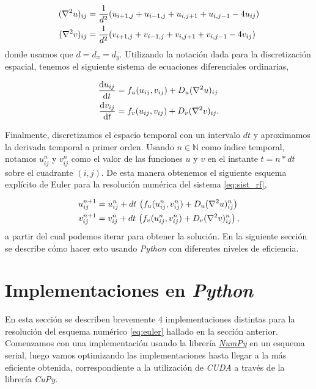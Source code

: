 \begin{equation}
  \begin{split}
    (\laplacian u)_{ij} &= \frac{1}{d^2}(u_{i+1,j}+u_{i-1,j}+u_{i,j+1}+u_{i,j-1}-4u_{ij})\\
    (\laplacian v)_{ij} &= \frac{1}{d^2}(v_{i+1,j}+v_{i-1,j}+v_{i,j+1}+v_{i,j-1}-4v_{ij})
    \label{eq:lap}
  \end{split}
\end{equation}
donde usamos que $d = d_x = d_y$.  Utilizando la notación dada para la discretización espacial, tenemos el siguiente sistema 
de ecuaciones diferenciales ordinarias,

\begin{equation}
  \begin{split}
  \dv{u_{ij}}{t} & = f_u(u_{ij},v_{ij}) + D_u (\laplacian u)_{ij} \\
  \dv{v_{ij}}{t} & = f_v(u_{ij},v_{ij}) + D_v (\laplacian v)_{ij}.
  \label{eq:sist_ord}
  \end{split}
\end{equation}

Finalmente, discretizamos el espacio temporal con un intervalo $dt$ y aproximamos la derivada temporal a primer orden. Usando $n\in \mathbb{N}$ como índice temporal, notamos $u_{ij}^n$ 
y $v_{ij}^n$ como el valor de las funciones $u$ y $v$ en el instante $t = n*dt$ sobre el cuadrante $(i,j)$. De esta manera obtenemos el siguiente 
esquema explícito de Euler para la resolución numérica del sistema \ref{eq:sist_rf},

\begin{equation}
  \begin{split}
    u_{ij}^{n+1} & = u_{ij}^n + dt \, \left(f_u(u_{ij}^n,v_{ij}^n) + D_u (\laplacian u)_{ij}^n\right) \\
    v_{ij}^{n+1} & = v_{ij}^n + dt \, \left(f_v(u_{ij}^n,v_{ij}^n) + D_v (\laplacian v)_{ij}^n\right),  
    \label{eq:euler}
  \end{split}
\end{equation}
a partir del cual podemos iterar para obtener la solución. En la siguiente sección se describe cómo hacer esto usando \textit{Python} con diferentes niveles de eficiencia.


\section{Implementaciones en \textit{Python}}
\label{S:Python}

En esta sección se describen brevemente 4 implementaciones distintas para la resolución del esquema numérico \ref{eq:euler} hallado en la sección anterior. Comenzamos con una
implementación usando la librería \href{https://numpy.org/}{\textit{NumPy}} \cite{numpy} en un esquema serial, luego vamos optimizando las implementaciones
hasta llegar a la más eficiente obtenida, correspondiente a la utilización de \textit{CUDA} a través de la librería \textit{CuPy}. 

